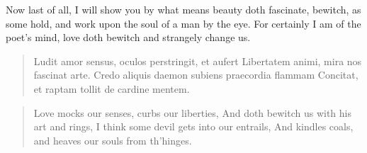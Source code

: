Now last of all, I will show you by what means beauty doth fascinate,
bewitch, as some hold, and work upon the soul of a man by the eye. For
certainly I am of the poet's mind, love doth bewitch and strangely
change us.

\begin{latin}
\begin{verse}%
Ludit amor sensus, oculos perstringit, et aufert
Libertatem animi, mira nos fascinat arte.
Credo aliquis daemon subiens praecordia flammam
Concitat, et raptam tollit de cardine mentem.
\end{verse}%
\end{latin}
\translationrule%
\begin{verse}%
Love mocks our senses, curbs our liberties,
And doth bewitch us with his art and rings,
I think some devil gets into our entrails,
And kindles coals, and heaves our souls from th'hinges.
\end{verse}%

